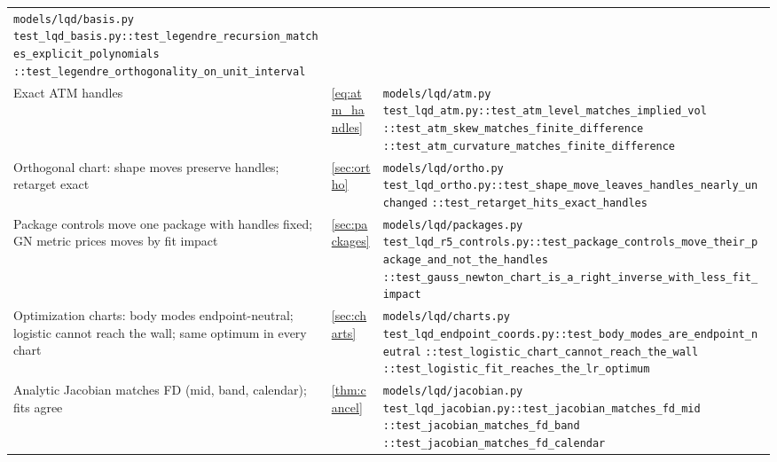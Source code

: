 \documentclass[11pt]{article}
\begin{document}
\begin{longtable}{@{}p{}p{}p{}@{}}
\nolinkurl{models/lqd/basis.py}\newline
\nolinkurl{test_lqd_basis.py::test_legendre_recursion_matches_explicit_polynomials}\newline
\nolinkurl{::test_legendre_orthogonality_on_unit_interval}\\
\addlinespace
Exact ATM handles &
\eqref{eq:atm_handles} &
\nolinkurl{models/lqd/atm.py}\newline
\nolinkurl{test_lqd_atm.py::test_atm_level_matches_implied_vol}\newline
\nolinkurl{::test_atm_skew_matches_finite_difference}\newline
\nolinkurl{::test_atm_curvature_matches_finite_difference}\\
\addlinespace
Orthogonal chart: shape moves preserve handles; retarget exact &
\cref{sec:ortho} &
\nolinkurl{models/lqd/ortho.py}\newline
\nolinkurl{test_lqd_ortho.py::test_shape_move_leaves_handles_nearly_unchanged}\newline
\nolinkurl{::test_retarget_hits_exact_handles}\\
\addlinespace
Package controls move one package with handles fixed; GN metric prices moves
by fit impact &
\cref{sec:packages} &
\nolinkurl{models/lqd/packages.py}\newline
\nolinkurl{test_lqd_r5_controls.py::test_package_controls_move_their_package_and_not_the_handles}\newline
\nolinkurl{::test_gauss_newton_chart_is_a_right_inverse_with_less_fit_impact}\\
\addlinespace
Optimization charts: body modes endpoint-neutral; logistic cannot reach the
wall; same optimum in every chart &
\cref{sec:charts} &
\nolinkurl{models/lqd/charts.py}\newline
\nolinkurl{test_lqd_endpoint_coords.py::test_body_modes_are_endpoint_neutral}\newline
\nolinkurl{::test_logistic_chart_cannot_reach_the_wall}\newline
\nolinkurl{::test_logistic_fit_reaches_the_lr_optimum}\\
\addlinespace
Analytic Jacobian matches FD (mid, band, calendar); fits agree &
\cref{thm:cancel} &
\nolinkurl{models/lqd/jacobian.py}\newline
\nolinkurl{test_lqd_jacobian.py::test_jacobian_matches_fd_mid}\newline
\nolinkurl{::test_jacobian_matches_fd_band}\newline
\nolinkurl{::test_jacobian_matches_fd_calendar}\newline

\end{longtable}
\end{document}
